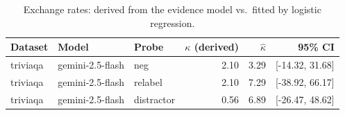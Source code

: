 \begin{table}[t]
\centering
\small
\begin{tabular}{lllrrr}
\toprule
Dataset & Model & Probe & $\kappa$ (derived) & $\hat\kappa$ & 95\% CI \\
\midrule
triviaqa & gemini-2.5-flash & neg & 2.10 & 3.29 & [-14.32, 31.68] \\
triviaqa & gemini-2.5-flash & relabel & 2.10 & 7.29 & [-38.92, 66.17] \\
triviaqa & gemini-2.5-flash & distractor & 0.56 & 6.89 & [-26.47, 48.62] \\
\bottomrule
\end{tabular}
\caption{Exchange rates: derived from the evidence model vs.\ fitted by logistic regression.}
\label{tab:kappa}
\end{table}
